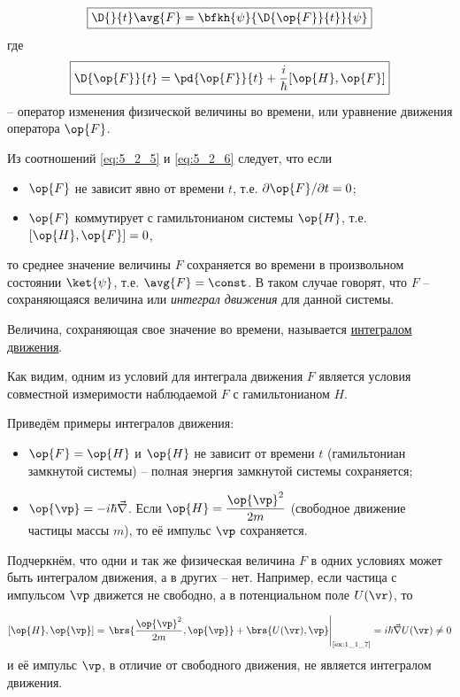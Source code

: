 \begin{equation}
\label{eq:5_2_5}
  \boxed{
    \D{}{t} \avg{F} = \bfkh{\psi}{\D{\op{F}}{t}}{\psi}
  }
\end{equation}%
%
где
\begin{equation}
\label{eq:5_2_6}
\boxed{\D{\op{F}}{t} = \pd{\op{F}}{t} + \frac{i}{\hbar} [\op{H}, \op{F}]}
\end{equation}
-- оператор изменения физической величины во времени, или уравнение движения оператора $\op{F}$.

Из соотношений \eqref{eq:5_2_5} и \eqref{eq:5_2_6} следует, что если
\begin{itemize}
\item $\op{F}$ не зависит явно от времени $t$, т.е. $\partial\op{F}/\partial{t} = 0$;
\item $\op{F}$ коммутирует с гамильтонианом системы $\op{H}$, т.е. $[\op{H}, \op{F}]=0$,
\end{itemize}%
%
то среднее значение величины $F$ сохраняется во времени в произвольном состоянии $\ket{\psi}$, т.е. $\avg{F} = \const$. В таком случае говорят, что $F$ -- сохраняющаяся величина или {\em интеграл движения} для данной системы.

\begin{defn}
Величина, сохраняющая свое значение во времени, называется \underline{интегралом движения}.
\end{defn}%
%
Как видим, одним из условий для интеграла движения $F$ является условия совместной измеримости наблюдаемой $F$ с гамильтонианом $H$.

Приведём примеры интегралов движения:

\begin{itemize}
\item $\op{F} = \op{H}$ и $\op{H}$ не зависит от времени $t$ (гамильтониан замкнутой системы) -- полная энергия замкнутой системы сохраняется;
\item $\op{\vp} = - i \hbar \vec{\nabla}$.  Если $\displaystyle\op{H} = \frac{\op{\vp}^2}{2m}$ (свободное движение частицы массы $m$), то её импульс $\vp$ сохраняется.
\end{itemize}%
%
Подчеркнём, что одни и так же физическая величина $F$ в одних условиях может быть интегралом движения, а в других -- нет. Например, если частица с импульсом $\vp$ движется не свободно, а в потенциальном поле $U(\vr)$, то

\begin{equation}
\label{eq:5_2_7}
  [\op{H}, \op{\vp}] =
  \left.
    \brs{\frac{\op{\vp}^2}{2m}, \op{\vp}} + \brs{U(\vr), \vp}
  \right|_{\text{\cref{ex:1_1_7}}} =
  i \hbar \vec{\nabla} U(\vr) \ne 0
\end{equation}%
%
и её импульс $\vp$, в отличие от свободного движения, не является интегралом движения.

